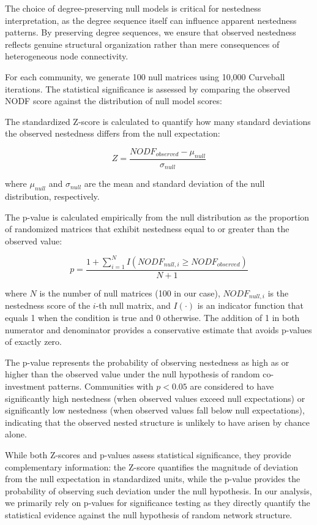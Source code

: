The choice of degree-preserving null models is critical for nestedness interpretation, as the degree sequence itself can influence apparent nestedness patterns. By preserving degree sequences, we ensure that observed nestedness reflects genuine structural organization rather than mere consequences of heterogeneous node connectivity.

For each community, we generate 100 null matrices using 10,000 Curveball iterations. The statistical significance is assessed by comparing the observed NODF score against the distribution of null model scores:


The standardized Z-score is calculated to quantify how many standard deviations the observed nestedness differs from the null expectation:

\begin{equation}
Z = \frac{NODF_{observed} - \mu_{null}}{\sigma_{null}}
\end{equation}

where $\mu_{null}$ and $\sigma_{null}$ are the mean and standard deviation of the null distribution, respectively.

The p-value is calculated empirically from the null distribution as the proportion of randomized matrices that exhibit nestedness equal to or greater than the observed value:

\begin{equation}
p = \frac{1 + \sum_{i=1}^{N} I(NODF_{null,i} \geq NODF_{observed})}{N + 1}
\end{equation}

where $N$ is the number of null matrices (100 in our case), $NODF_{null,i}$ is the nestedness score of the $i$-th null matrix, and $I(\cdot)$ is an indicator function that equals 1 when the condition is true and 0 otherwise. The addition of 1 in both numerator and denominator provides a conservative estimate that avoids p-values of exactly zero.

The p-value represents the probability of observing nestedness as high as or higher than the observed value under the null hypothesis of random co-investment patterns. Communities with $p < 0.05$ are considered to have significantly high nestedness (when observed values exceed null expectations) or significantly low nestedness (when observed values fall below null expectations), indicating that the observed nested structure is unlikely to have arisen by chance alone.

While both Z-scores and p-values assess statistical significance, they provide complementary information: the Z-score quantifies the magnitude of deviation from the null expectation in standardized units, while the p-value provides the probability of observing such deviation under the null hypothesis. In our analysis, we primarily rely on p-values for significance testing as they directly quantify the statistical evidence against the null hypothesis of random network structure.

\pagebreak